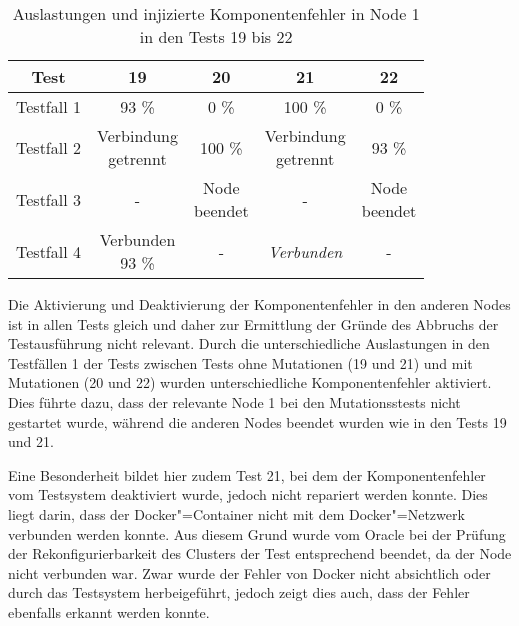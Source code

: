 \begin{table}[h]
    \begin{tabular}{c|cccc}
    	   Test    &                19                 &             20             &                21                 &             22             \\ \hline
    	Testfall 1 &               93 \%               &            0 \%            &              100 \%               &            0 \%            \\
    	Testfall 2 & \makecell{Verbindung \\ getrennt} &          100  \%           & \makecell{Verbindung \\ getrennt} &           93  \%           \\
    	Testfall 3 &                 -                 & \makecell{Node \\ beendet} &                 -                 & \makecell{Node \\ beendet} \\
    	Testfall 4 &   \makecell{Verbunden \\ 93 \%}   &             -              &         \emph{Verbunden}          &             -
    \end{tabular} 
    \caption{Auslastungen und injizierte Komponentenfehler in Node 1 in den Tests 19 bis 22}
    \label{tab:loadNode1Tests1922}
\end{table}

Die Aktivierung und Deaktivierung der Komponentenfehler in den anderen Nodes ist in allen Tests gleich und daher zur Ermittlung der Gründe des Abbruchs der Testausführung nicht relevant.
Durch die unterschiedliche Auslastungen in den Testfällen 1 der Tests zwischen Tests ohne Mutationen (19 und 21) und mit Mutationen (20 und 22) wurden unterschiedliche Komponentenfehler aktiviert.
Dies führte dazu, dass der relevante Node 1 bei den Mutationsstests nicht gestartet wurde, während die anderen Nodes beendet wurden wie in den Tests 19 und 21.

Eine Besonderheit bildet hier zudem Test 21, bei dem der Komponentenfehler vom Testsystem deaktiviert wurde, jedoch nicht repariert werden konnte.
Dies liegt darin, dass der Docker"=Container nicht mit dem Docker"=Netzwerk verbunden werden konnte.
Aus diesem Grund wurde vom Oracle bei der Prüfung der Rekonfigurierbarkeit des Clusters der Test entsprechend beendet, da der Node nicht verbunden war.
Zwar wurde der Fehler von Docker nicht absichtlich oder durch das Testsystem herbeigeführt, jedoch zeigt dies auch, dass der Fehler ebenfalls erkannt werden konnte.


